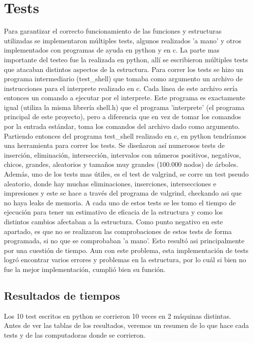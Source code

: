 \documentclass[a4paper, 12pt]{article}
\begin{document}
\section{Tests}
	Para garantizar el correcto funcionamiento de las funciones y estructuras utilizadas se implementaron múltiples tests, algunos realizados 'a mano' y otros implementados con programas de ayuda en python y en c. La parte mas importante del testeo fue la realizada en python, allí se escribieron múltiples tests que atacaban distintos aspectos de la estructura. Para correr los tests se hizo un programa intermediario (test\_shell) que tomaba como argumento un archivo de instrucciones para el interprete realizado en c. Cada línea de este archivo sería entonces un comando a ejecutar por el interprete. Este programa es exactamente igual (utiliza la misma librería shell.h) que el programa 'interprete' (el programa principal de este proyecto), pero a diferencia que en vez de tomar los comandos por la entrada estándar, toma los comandos del archivo dado como argumento.
    Partiendo entonces del programa test\_shell realizado en c, en python tendríamos una herramienta para correr los tests. Se diseñaron así numerosos tests de inserción, eliminación, intersección, intervalos con números positivos, negativos, chicos, grandes, aleatorios y tamaños muy grandes (100.000 nodos) de árboles. Además, uno de los tests mas útiles, es el test de valgrind, se corre un test pseudo aleatorio, donde hay muchas eliminaciones, inserciones, intersecciones e impresiones y este se hace a través del programa de valgrind, checkando asi que no haya leaks de memoria. A cada uno de estos tests se les tomo el tiempo de ejecución para tener un estimativo de eficacia de la estructura y como los distintos cambios afectaban a la estructura. Como punto negativo en este apartado, es que no se realizaron las comprobaciones de estos tests de forma programada, si no que se comprobaban 'a mano'. Esto resultó asi principalmente por una cuestión de tiempo.
    Aun con este problema, esta implementación de tests logró encontrar varios errores y problemas en la estructura, por lo cuál si bien no fue la mejor implementación, cumplió bien su función.
    
\subsection{Resultados de tiempos}
	Los 10 test escritos en python se corrieron 10 veces en 2 máquinas distintas. Antes de ver las tablas de los resultados, veremos un resumen de lo que hace cada tests y de las computadoras donde se corrieron.
    
\end{document}
